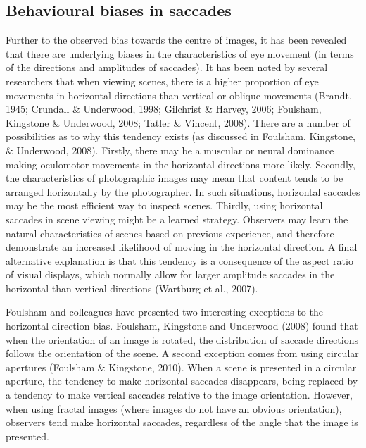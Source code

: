 \documentclass[a4paper, onecolumn, oneside, 11pt]{article}
\begin{document}
\subsection{Behavioural biases in saccades}
Further to the observed bias towards the centre of images, it has been revealed that there are underlying biases in the characteristics of eye movement (in terms of the directions and amplitudes of saccades). It has been noted by several researchers that when viewing scenes, there is a higher proportion of eye movements in horizontal directions than vertical or oblique movements (Brandt, 1945; Crundall \& Underwood, 1998; Gilchrist \& Harvey, 2006; Foulsham, Kingstone \& Underwood, 2008; Tatler \& Vincent, 2008). There are a number of possibilities as to why this tendency exists (as discussed in Foulsham, Kingstone, \& Underwood, 2008). Firstly, there may be a muscular or neural dominance making oculomotor movements in the horizontal directions more likely. Secondly, the characteristics of photographic images may mean that content tends to be arranged horizontally by the photographer. In such situations, horizontal saccades may be the most efficient way to inspect scenes. Thirdly, using horizontal saccades in scene viewing might be a learned strategy. Observers may learn the natural characteristics of scenes based on previous experience, and therefore demonstrate an increased likelihood of moving in the horizontal direction. A final alternative explanation is that this tendency is a consequence of the aspect ratio of visual displays, which normally allow for larger amplitude saccades in the horizontal than vertical directions (Wartburg et al., 2007).

Foulsham and colleagues have presented two interesting exceptions to the horizontal direction bias. Foulsham, Kingstone and Underwood (2008) found that when the orientation of an image is rotated, the distribution of saccade directions follows the orientation of the scene. A second exception comes from using circular apertures (Foulsham \& Kingstone, 2010). When a scene is presented in a circular aperture, the tendency to make horizontal saccades disappears, being replaced by a tendency to make vertical saccades relative to the image orientation. However, when using fractal images (where images do not have an obvious orientation), observers tend make horizontal saccades, regardless of the angle that the image is presented.
\end{document}
